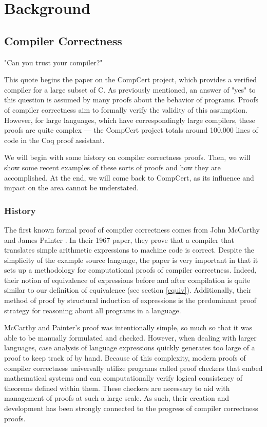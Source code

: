 \chapter{Background}
\section{Compiler Correctness}
"Can you trust your compiler?"

This quote begins the paper on the CompCert \cite{leroy_formal_2009} project, which provides a verified compiler for a large subset of C. As previously mentioned, an answer of "yes" to this question is assumed by many proofs about the behavior of programs. Proofs of compiler correctness aim to formally verify the validity of this assumption. However, for large languages, which have correspondingly large compilers, these proofs are quite complex --- the CompCert project totals around 100,000 lines of code in the Coq proof assistant.

We will begin with some history on compiler correctness proofs. Then, we will show some recent examples of these sorts of proofs and how they are accomplished. At the end, we will come back to CompCert, as its influence and impact on the area cannot be understated.

\subsection{History}
The first known formal proof of compiler correctness comes from John McCarthy and James Painter \cite{mccarthy_correctness_1967}. In their 1967 paper, they prove that a compiler that translates simple arithmetic expressions to machine code is correct. Despite the simplicity of the example source language, the paper is very important in that it sets up a methodology for computational proofs of compiler correctness. Indeed, their notion of equivalence of expressions before and after compilation is quite similar to our definition of equivalence (see section \ref{equiv}). Additionally, their method of proof by structural induction of expressions is the predominant proof strategy for reasoning about all programs in a language.

McCarthy and Painter's proof was intentionally simple, so much so that it was able to be manually formulated and checked. However, when dealing with larger languages, case analysis of language expressions quickly generates too large of a proof to keep track of by hand. Because of this complexity, modern proofs of compiler correctness universally utilize programs called proof checkers that embed mathematical systems and can computationally verify logical consistency of theorems defined within them. These checkers are necessary to aid with management of proofs at such a large scale. As such, their creation and development has been strongly connected to the progress of compiler correctness proofs.

